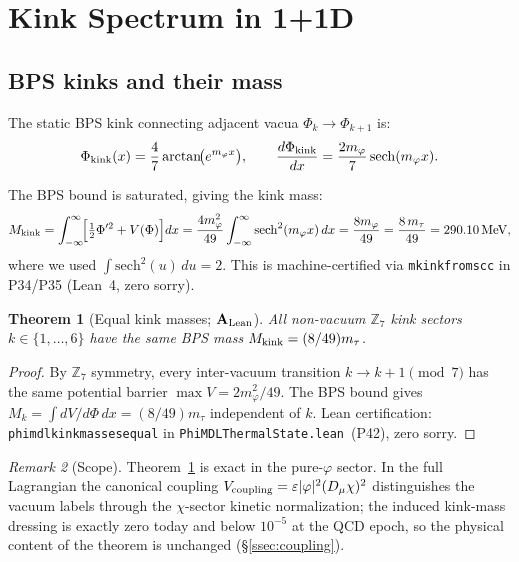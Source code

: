\documentclass[11pt]{article}
\newtheorem{theorem}{Theorem}[section]
\theoremstyle{remark}
\newtheorem{remark}[theorem]{Remark}
\newcommand{\ZS}{\mathbb{Z}_7}
\newcommand{\lean}[1]{%
  \penalty-100
  \begingroup\def\_{\textunderscore\allowbreak}\texttt{#1}\endgroup}
\newcommand{\Mkink}{M_{\rm kink}}
\newcommand{\mtau}{m_\tau}
\newcommand{\CatAL}{\ensuremath{\textbf{A}_{\rm Lean}}}
\begin{document}
\section{Kink Spectrum in 1+1D}
\label{sec:kinks}

\subsection{BPS kinks and their mass}
\label{ssec:bps}

The static BPS kink connecting adjacent vacua $\Phi_k\to\Phi_{k+1}$ is:
\begin{equation}
  \Phi_{\rm kink}(x) = \frac{4}{7}\arctan\!\bigl(e^{m_\varphi x}\bigr),
  \qquad
  \frac{d\Phi_{\rm kink}}{dx} = \frac{2m_\varphi}{7}\,\mathrm{sech}(m_\varphi x).
  \label{eq:kink_profile}
\end{equation}



The BPS bound is saturated, giving the kink mass:
\begin{equation}
  \Mkink = \int_{-\infty}^{\infty}\!\Bigl[\tfrac{1}{2}\Phi'^2 + V(\Phi)\Bigr]dx
  = \frac{4m_\varphi^2}{49}\int_{-\infty}^{\infty}\mathrm{sech}^2(m_\varphi x)\,dx
  = \frac{8m_\varphi}{49} = \frac{8\,\mtau}{49} = 290.10\,\mathrm{MeV},
  \label{eq:bps}
\end{equation}
where we used $\int \mathrm{sech}^2(u)\,du = 2$.  This is machine-certified
via \lean{mkink\_from\_scc} in P34/P35 (Lean~4, zero sorry).

\begin{theorem}[Equal kink masses; $\CatAL$]
  \label{thm:equal_masses}
  All non-vacuum $\ZS$ kink sectors $k\in\{1,\ldots,6\}$ have the same BPS
  mass $\Mkink = (8/49)\mtau$.
\end{theorem}
\begin{proof}
  By $\ZS$ symmetry, every inter-vacuum transition $k\to k+1\pmod{7}$ has
  the same potential barrier $\max V = 2m_\varphi^2/49$.  The BPS bound gives
  $M_k = \int dV/d\Phi\,dx = (8/49)\mtau$ independent of $k$.
  Lean certification: \lean{phimdl\_kink\_masses\_equal} in
  \lean{PhiMDLThermalState.lean}~(P42), zero sorry.
\end{proof}

\begin{remark}[Scope]
  Theorem~\ref{thm:equal_masses} is exact in the pure-$\varphi$ sector.  In
  the full Lagrangian the canonical coupling
  $V_{\rm coupling}=\varepsilon|\varphi|^2(D_\mu\chi)^2$ distinguishes the
  vacuum labels through the $\chi$-sector kinetic normalization; the induced
  kink-mass dressing is exactly zero today and below $10^{-5}$ at the QCD
  epoch, so the physical content of the theorem is unchanged
  (\S\ref{ssec:coupling}).
\end{remark}
\end{document}
